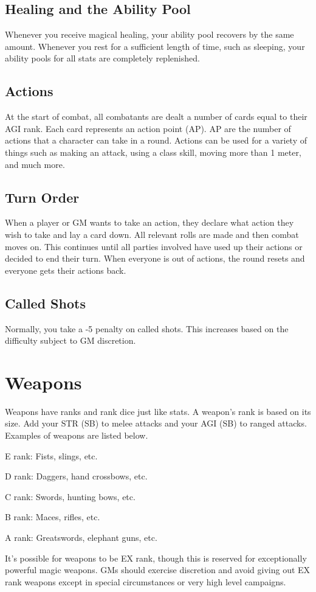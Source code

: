 \begin{multicols}{2}
\subsection{Healing and the Ability Pool}
Whenever you receive magical healing, your ability pool recovers by the same amount. Whenever you rest for a sufficient length of time, such as sleeping, your ability pools for all stats are completely replenished.

\subsection{Actions}
At the start of combat, all combatants are dealt a number of cards equal to their AGI rank. Each card represents an action point (AP). AP are the number of actions that a character can take in a round. Actions can be used for a variety of things such as making an attack, using a class skill, moving more than 1 meter, and much more.

\subsection{Turn Order}
When a player or GM wants to take an action, they declare what action they wish to take and lay a card down. All relevant rolls are made and then combat moves on. This continues until all parties involved have used up their actions or decided to end their turn. When everyone is out of actions, the round resets and everyone gets their actions back.

\subsection{Called Shots}
Normally, you take a -5 penalty on called shots. This increases based on the difficulty subject to GM discretion.

\section{Weapons}

Weapons have ranks and rank dice just like stats. A weapon's rank is based on its size. Add your STR (SB) to melee attacks and your AGI (SB) to ranged attacks. Examples of weapons are listed below.

\begin{wldescription}
\item [E rank:] Fists, slings, etc.
\item [D rank:] Daggers, hand crossbows, etc.
\item [C rank:] Swords, hunting bows, etc.
\item [B rank:] Maces, rifles, etc.
\item [A rank:] Greatswords, elephant guns, etc.
\end{wldescription}
It's possible for weapons to be EX rank, though this is reserved for exceptionally powerful magic weapons. GMs should exercise discretion and avoid giving out EX rank weapons except in special circumstances or very high level campaigns.


\end{multicols}
